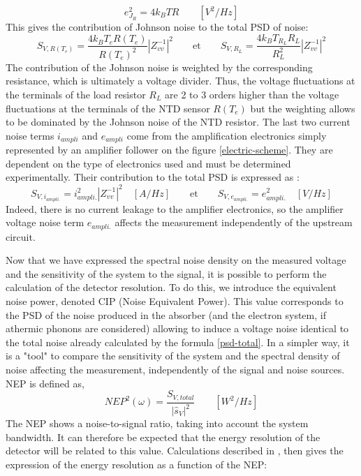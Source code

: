 \begin{equation}
e_{J_R}^2 = 4k_B T R \qquad [V^2/Hz]
\end{equation}
This gives the contribution of Johnson noise to the total PSD of noise:
\begin{equation}
S_{V,R(T_e)} = \frac{4 k_B T_e R(T_e)}{R(T_e)^2} \left\vert Z_{vv}^{-1}\right\vert^2
\qquad \textrm{et} \qquad
S_{V,R_L} = \frac{4 k_B T_{R_L} R_L}{R_L^2} \left\vert Z_{vv}^{-1}\right\vert^2
\end{equation}
The contribution of the Johnson noise is weighted by the corresponding resistance, which is ultimately a voltage divider. Thus, the voltage fluctuations at the terminals of the load resistor $R_L$ are 2 to 3 orders higher than the voltage fluctuations at the terminals of the NTD sensor $R(T_e)$ but the weighting allows to be dominated by the Johnson noise of the NTD resistor.
The last two current noise terms $i_{ampli}$ and $e_{ampli}$ come from the amplification electronics simply represented by an amplifier follower on the figure \ref{electric-scheme}. They are dependent on the type of electronics used and must be determined experimentally. Their contribution to the total PSD is expressed as :
\begin{equation}
\label{bruit-ampli}
S_{V,i_{ampli.}} = i_{ampli.}^2 \left\vert Z_{vv}^{-1}\right\vert^2 \quad [A/Hz]
\qquad
\textrm{et}
\qquad
S_{V,e_{ampli.}} = e_{ampli.}^2 \quad [V/Hz]
\end{equation}
Indeed, there is no current leakage to the amplifier electronics, so the amplifier voltage noise term $e_{ampli.}$ affects the measurement independently of the upstream circuit.

Now that we have expressed the spectral noise density on the measured voltage and the sensitivity of the system to the signal, it is possible to perform the calculation of the detector resolution. To do this, we introduce the equivalent noise power, denoted CIP (Noise Equivalent Power). This value corresponds to the PSD of the noise produced in the absorber (and the electron system, if athermic phonons are considered) allowing to induce a voltage noise identical to the total noise already calculated by the formula \ref{psd-total}. In a simpler way, it is a "tool" to compare the sensitivity of the system and the spectral density of noise affecting the measurement, independently of the signal and noise sources. NEP is defined as,
\begin{equation}
\label{nep}
NEP^2(\omega) =  \frac{S_{V,total}}{|\hat{s}_V|^2} \qquad [W^2/Hz]
\end{equation}
The NEP shows a noise-to-signal ratio, taking into account the system bandwidth. It can therefore be expected that the energy resolution of the detector will be related to this value. Calculations described in \cite{cpd}, then gives the expression of the energy resolution as a function of the NEP:

